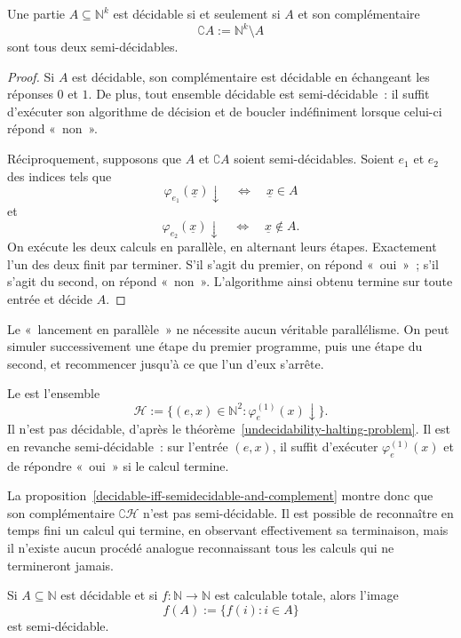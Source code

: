\begin{prop}\label{decidable-iff-semidecidable-and-complement}
Une partie $A\subseteq\mathbb{N}^k$ est décidable si et seulement si
$A$ et son complémentaire
\[
\complement A:=\mathbb{N}^k\setminus A
\]
sont tous deux semi-décidables.
\end{prop}

\begin{proof}
Si $A$ est décidable, son complémentaire est décidable en échangeant
les réponses $0$ et $1$.  De plus, tout ensemble décidable est
semi-décidable : il suffit d'exécuter son algorithme de décision et de
boucler indéfiniment lorsque celui-ci répond « non ».

Réciproquement, supposons que $A$ et $\complement A$ soient
semi-décidables.  Soient $e_1$ et $e_2$ des indices tels que
\[
\varphi_{e_1}(\underline{x})\downarrow
 \quad\Longleftrightarrow\quad
\underline{x}\in A
\]
et
\[
\varphi_{e_2}(\underline{x})\downarrow
 \quad\Longleftrightarrow\quad
\underline{x}\notin A.
\]
On exécute les deux calculs en parallèle, en alternant leurs étapes.
Exactement l'un des deux finit par terminer.  S'il s'agit du premier,
on répond « oui » ; s'il s'agit du second, on répond « non ».
L'algorithme ainsi obtenu termine sur toute entrée et décide $A$.
\end{proof}

Le « lancement en parallèle » ne nécessite aucun véritable parallélisme.
On peut simuler successivement une étape du premier programme, puis une
étape du second, et recommencer jusqu'à ce que l'un d'eux s'arrête.

\thingy Le  est
l'ensemble
\[
\mathscr{H}
 :=\{(e,x)\in\mathbb{N}^2:
           \varphi_e^{(1)}(x)\downarrow\}.
\]
Il n'est pas décidable, d'après le
théorème \ref{undecidability-halting-problem}.  Il est en revanche
semi-décidable : sur l'entrée $(e,x)$, il suffit d'exécuter
$\varphi_e^{(1)}(x)$ et de répondre « oui » si le calcul termine.

La proposition \ref{decidable-iff-semidecidable-and-complement} montre
donc que son complémentaire $\complement\mathscr{H}$ n'est pas
semi-décidable.  Il est possible de reconnaître en temps fini un
calcul qui termine, en observant effectivement sa terminaison, mais il
n'existe aucun procédé analogue reconnaissant tous les calculs qui ne
termineront jamais.

\thingy Si $A\subseteq\mathbb{N}$ est décidable et si
$f\colon\mathbb{N}\to\mathbb{N}$ est calculable totale, alors l'image
\[
f(A):=\{f(i):i\in A\}
\]
est semi-décidable.

